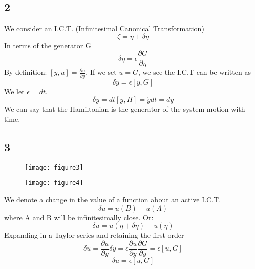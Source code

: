 \documentclass[12pt]{article}
\begin{document}
	\subsection*{2}
	We consider an I.C.T. (Infinitesimal Canonical Transformation)
	\begin{equation*}
		\zeta = \eta + \delta\eta
	\end{equation*}
	In terms of the generator G
	\begin{equation*}
		\delta\eta = \epsilon \frac{\partial G}{\partial \eta}
	\end{equation*}
	By definition: $[y, u] = \frac{\partial u}{\partial y}$. If we set $u=G$, we see the I.C.T can be written as
	\begin{equation*}
		\delta y = \epsilon [y, G]
	\end{equation*}
	We let $\epsilon = dt$.
	\begin{equation*}
		\delta y = dt [y, H] = \dot{y} dt = dy
	\end{equation*}
	We can say that the Hamiltonian is the generator of the system motion with time.
	
	\subsection*{3 }
	\begin{figure}[h]
		\centering
		\texttt{[image: figure3]}
		\caption{}
		\label{fig:figure3}
	\end{figure}
	\begin{figure}[h]
		\centering
		\texttt{[image: figure4]}
		\caption{}
		\label{fig:figure4}
	\end{figure}
	
	We denote a change in the value of a function about an active I.C.T.
	\begin{equation*}
		\delta u = u(B) - u(A)
	\end{equation*}
	where A and B will be infinitesimally close. Or:
	\begin{equation*}
		\delta u = u(\eta + \delta\eta) - u(\eta)
	\end{equation*}
	Expanding in a Taylor series and retaining the first order
	\begin{equation*}
		\delta u = \frac{\partial u}{\partial y} \delta y = \epsilon \frac{\partial u}{\partial y} \frac{\partial G}{\partial y} = \epsilon [u, G]
	\end{equation*}
	\begin{equation*}
		\delta u = \epsilon [u, G]
	\end{equation*}
	
\end{document}
